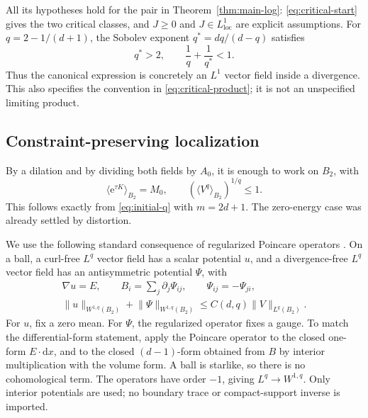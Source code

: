 \documentclass[11pt,a4paper]{article}
\numberwithin{equation}{section}
\theoremstyle{definition}
\theoremstyle{remark}\newtheorem{remark}[theorem]{Remark}
\newcommand{\ee}{\mathrm e}
\newcommand{\mean}[2]{\langle #1\rangle_{#2}}
\newcommand{\norm}[1]{\lVert #1\rVert}
\newcommand{\loc}{\mathrm{loc}}
\begin{document}
All its hypotheses hold for the pair in Theorem~\ref{thm:main-log}:
\eqref{eq:critical-start} gives the two critical classes, and \(J\geq0\)
and \(J\in L^1_{\loc}\) are explicit assumptions.
For \(q=2-1/(d+1)\), the Sobolev exponent \(q^*=dq/(d-q)\) satisfies
\[
 q^*>2,\qquad \frac1q+\frac1{q^*}<1.
\]
Thus the canonical expression is concretely an \(L^1\) vector field
inside a divergence. This also specifies the convention in
\eqref{eq:critical-product}; it is not an unspecified limiting product.

\subsection{Constraint-preserving localization}\label{subsec:localization}

By a dilation and by dividing both fields by \(A_0\), it is enough to work
on \(B_2\), with
\[
 \mean{\ee^{\tau K}}{B_2}=M_0,\qquad
 \left(\mean{V^q}{B_2}\right)^{1/q}\leq1.
\]
This follows exactly from \eqref{eq:initial-q} with \(m=2d+1\).
The zero-energy case was already settled by distortion.

We use the following standard consequence of regularized Poincare
operators \cite[Corollary~3.4, Remark~3.5 and
Proposition~4.1(i)]{CostabelMcIntosh2010}.
On a ball, a curl-free \(L^q\) vector field has a scalar potential \(u\),
and a divergence-free \(L^q\) vector field has an antisymmetric potential
\(\Psi\), with
\begin{equation}\label{eq:potential-bounds}
 \begin{gathered}
 \nabla u=E,\qquad B_i=\sum_j\partial_j\Psi_{ij},
                       \qquad \Psi_{ij}=-\Psi_{ji},\\
 \norm u_{W^{1,q}(B_2)}+\norm\Psi_{W^{1,q}(B_2)}
                 \leq C(d,q)\norm V_{L^q(B_2)}.
 \end{gathered}
\end{equation}
For \(u\), fix a zero mean. For \(\Psi\), the regularized operator fixes
a gauge. To match the differential-form statement, apply the Poincare
operator to the closed one-form \(E\cdot\mathrm dx\), and to the
closed \((d-1)\)-form obtained from \(B\) by interior multiplication
with the volume form. A ball is starlike, so there is no cohomological
term. The operators have order \(-1\), giving \(L^q\to W^{1,q}\).
Only interior potentials are used; no boundary trace or compact-support
inverse is imported.
\end{document}
